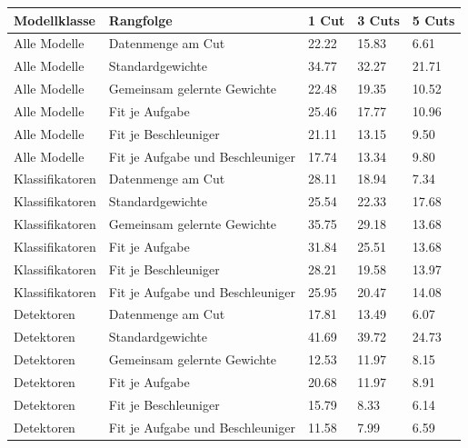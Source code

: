 \begin{tabular}{@{}lllll@{}}
\toprule
Modellklasse & Rangfolge & 1 Cut & 3 Cuts & 5 Cuts \\
\midrule
Alle Modelle & Datenmenge am Cut & 22.22 & 15.83 & 6.61 \\
Alle Modelle & Standardgewichte & 34.77 & 32.27 & 21.71 \\
Alle Modelle & Gemeinsam gelernte Gewichte & 22.48 & 19.35 & 10.52 \\
Alle Modelle & Fit je Aufgabe & 25.46 & 17.77 & 10.96 \\
Alle Modelle & Fit je Beschleuniger & 21.11 & 13.15 & 9.50 \\
Alle Modelle & Fit je Aufgabe und Beschleuniger & 17.74 & 13.34 & 9.80 \\
Klassifikatoren & Datenmenge am Cut & 28.11 & 18.94 & 7.34 \\
Klassifikatoren & Standardgewichte & 25.54 & 22.33 & 17.68 \\
Klassifikatoren & Gemeinsam gelernte Gewichte & 35.75 & 29.18 & 13.68 \\
Klassifikatoren & Fit je Aufgabe & 31.84 & 25.51 & 13.68 \\
Klassifikatoren & Fit je Beschleuniger & 28.21 & 19.58 & 13.97 \\
Klassifikatoren & Fit je Aufgabe und Beschleuniger & 25.95 & 20.47 & 14.08 \\
Detektoren & Datenmenge am Cut & 17.81 & 13.49 & 6.07 \\
Detektoren & Standardgewichte & 41.69 & 39.72 & 24.73 \\
Detektoren & Gemeinsam gelernte Gewichte & 12.53 & 11.97 & 8.15 \\
Detektoren & Fit je Aufgabe & 20.68 & 11.97 & 8.91 \\
Detektoren & Fit je Beschleuniger & 15.79 & 8.33 & 6.14 \\
Detektoren & Fit je Aufgabe und Beschleuniger & 11.58 & 7.99 & 6.59 \\
\bottomrule
\end{tabular}
